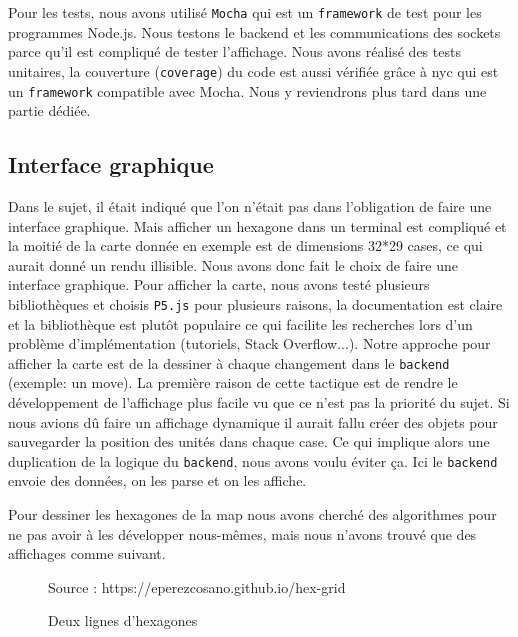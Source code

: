 Pour les tests, nous avons utilisé {\tt Mocha} qui est un {\tt framework} de test pour les programmes Node.js.
Nous testons le backend et les communications des sockets parce qu'il est compliqué de tester l'affichage.
Nous avons réalisé des tests unitaires, la couverture ({\tt coverage}) du code est aussi vérifiée grâce à nyc qui est un {\tt framework} compatible avec Mocha.
Nous y reviendrons plus tard dans une partie dédiée.

\subsection{Interface graphique}

Dans le sujet, il était indiqué que l'on n'était pas dans l'obligation de faire une interface graphique. Mais afficher un hexagone dans un terminal est compliqué et la moitié de la carte donnée en exemple est de dimensions 32*29 cases, ce qui aurait donné un rendu illisible. Nous avons donc fait le choix de faire une interface graphique. Pour afficher la carte, nous avons testé plusieurs bibliothèques et choisis \lstinline{P5.js} pour plusieurs raisons, la documentation est claire et la bibliothèque est plutôt populaire ce qui facilite les recherches lors d'un problème d'implémentation (tutoriels, Stack Overflow...).
Notre approche pour afficher la carte est de la dessiner à chaque changement dans le \lstinline{backend} (exemple: un move). La première raison de cette tactique est de rendre le développement de l'affichage plus facile vu que ce n'est pas la priorité du sujet. Si nous avions dû faire un affichage dynamique il aurait fallu créer des objets pour sauvegarder la position des unités dans chaque case. Ce qui implique alors une duplication de la logique du \lstinline{backend}, nous avons voulu éviter ça. Ici le \lstinline{backend} envoie des données, on les parse et on les affiche.

Pour dessiner les hexagones de la map nous avons cherché des algorithmes pour ne pas avoir à les développer nous-mêmes, mais nous n'avons trouvé que des affichages comme suivant.

\begin{figure}[H]
    \centering
    \def\stackalignment{r}
    {\scriptsize%
        Source : https://eperezcosano.github.io/hex-grid}
    \caption{Deux lignes d'hexagones}
    \label{fig:hexmap_exemple}
\end{figure}

